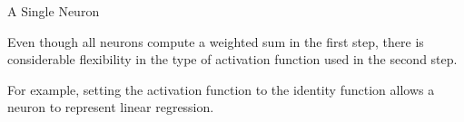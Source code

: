 \begin{frame} {A Single Neuron}
  \begin{itemize}
    \item \small{Even though all neurons compute a weighted sum in the first step, there is considerable flexibility in the type of activation function used in the second step.
    \item For example, setting the activation function to the identity function allows a neuron to represent linear regression.}
  \begin{figure}
    \centering
  \end{figure}  \end{itemize}
\end{frame}

